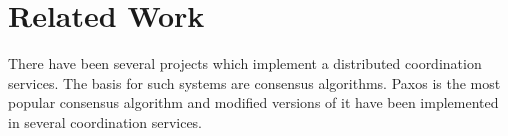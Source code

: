 \chapter{Related Work}

There have been several projects which implement a distributed coordination services. The basis for such systems are consensus algorithms. Paxos is the most popular consensus algorithm and modified versions of it have been implemented in several coordination services.
